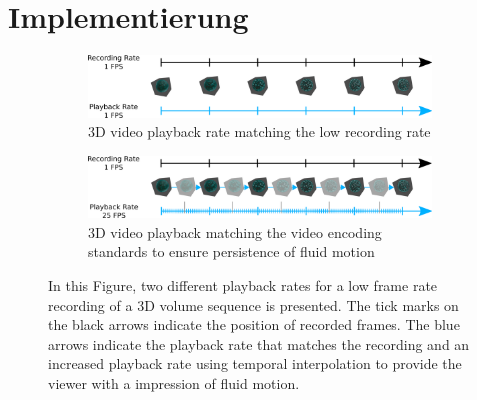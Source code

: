 \section{Implementierung}
























\begin{figure}[H]
    \centering
    \begin{subfigure}[b]{0.96\textwidth}
        \includegraphics[width=\textwidth]{images/01_introduction/motivation_temporal_superresolution_one.pdf}
        \caption{3D video playback rate matching the low recording rate}
        \label{subfig:playback_rate_matching}
    \end{subfigure}
    
	\vspace{1.0cm}
    
    \begin{subfigure}[b]{0.96\textwidth}
        \includegraphics[width=\textwidth]{images/01_introduction/motivation_temporal_superresolution_two.pdf}
        \caption{3D video playback matching the video encoding standards to ensure persistence of fluid motion}
        \label{subfig:playback_rate_higher}
    \end{subfigure}
    \caption[Concept of Temporal Super Resolution in a 3D Video Player]{In this Figure, two different playback rates for a low frame rate recording of a 3D volume sequence is presented. The tick marks on the black arrows indicate the position of recorded frames. The blue arrows indicate the playback rate that matches the recording  and an increased playback rate  using temporal interpolation to provide the viewer with a impression of fluid motion. }
    \label{fig:temporal_superresolution}
\end{figure}